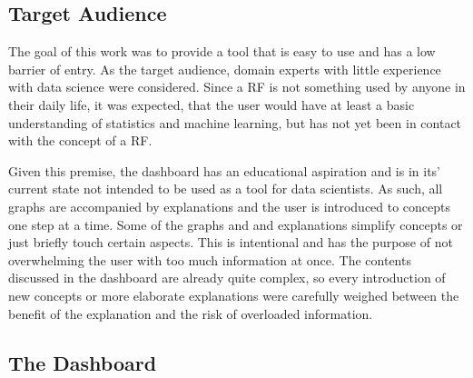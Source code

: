 \documentclass[a4paper, 12pt]{article}
\begin{document}
\subsection{Target Audience}
The goal of this work was to provide a tool that is easy to use and has a low barrier of entry.
As the target audience, domain experts with little experience with data science were considered.
Since a RF is not something used by anyone in their daily life, it was expected, that the user
would have at least a basic understanding of statistics and machine learning, but has not yet
been in contact with the concept of a RF. \par
Given this premise, the dashboard has an educational aspiration and is in its' current state
not intended to be used as a tool for data scientists. As such, all graphs are accompanied by
explanations and the user is introduced to concepts one step at a time. Some of the graphs and
and explanations simplify concepts or just briefly touch certain aspects. This is intentional
and has the purpose of not overwhelming the user with too much information at once. The contents
discussed in the dashboard are already quite complex, so every introduction of new concepts
or more elaborate explanations were carefully weighed between the benefit of the explanation
and the risk of overloaded information. \par

\subsection{The Dashboard}
\end{document}
